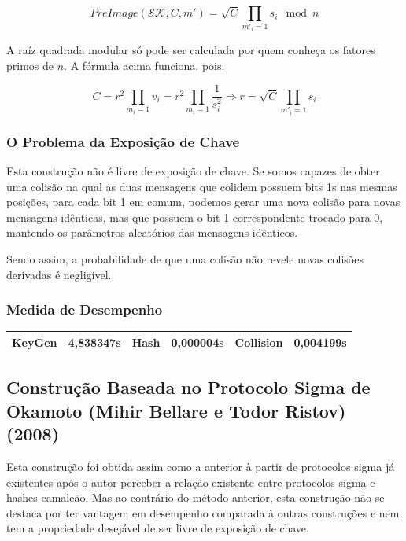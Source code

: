 \documentclass[a4paper]{article}
\begin{document}
    $$
    PreImage(\mathcal{SK}, C, m') = \sqrt{C}\prod_{m'_i=1}s_i \mod n
    $$
    
    A raíz quadrada modular só pode ser calculada por quem conheça os
    fatores primos de $n$. A fórmula acima funciona, pois:
    
    $$ C = r^2\prod_{m_i=1}v_i =
    r^2\prod_{m_i=1}\frac{1}{s_i^2}\Longrightarrow r=\sqrt{C}\prod_{m'_i=1}s_i
    $$
    
    \subsubsection{O Problema da Exposição de Chave}
    
    Esta construção não é livre de exposição de chave. Se somos capazes de
    obter uma colisão na qual as duas mensagens que colidem possuem bits
    1s nas mesmas posições, para cada bit 1 em comum, podemos gerar uma
    nova colisão para novas mensagens idênticas, mas que possuem o bit 1
    correspondente trocado para 0, mantendo os parâmetros aleatórios das
    mensagens idênticos.
    
    Sendo assim, a probabilidade de que uma colisão não revele novas
    colisões derivadas é negligível.
    
    \subsubsection{Medida de Desempenho}
    
    \begin{center}
    \begin{tabular}{|c|c|c|c|c|c|}
      \hline
      KeyGen & 4,838347s & Hash & 0,000004s & Collision & 0,004199s\\
      \hline
    \end{tabular}
    \end{center}
    
    \subsection{Construção Baseada no Protocolo Sigma de Okamoto
      (Mihir Bellare e Todor Ristov) (2008)\cite{sigma}}
    
    Esta construção foi obtida assim como a anterior à partir de
    protocolos sigma já existentes após o autor perceber a relação
    existente entre protocolos sigma e hashes camaleão. Mas ao contrário
    do método anterior, esta construção não se destaca por ter vantagem em
    desempenho comparada à outras construções e nem tem a propriedade
    desejável de ser livre de exposição de chave.
    
\end{document}
